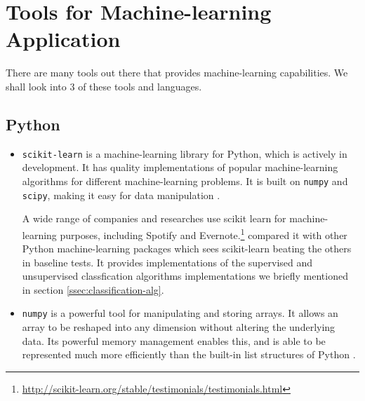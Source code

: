 


\newpage
\section{Tools for Machine-learning Application}
There are many tools out there that provides machine-learning capabilities. We shall look into 3 of these tools and languages. 

\subsection{Python}
\begin{itemize}
  \item \texttt{scikit-learn} is a machine-learning library for Python, which is actively in development. It has quality implementations of popular machine-learning algorithms for different machine-learning problems. It is built on \texttt{numpy} and \texttt{scipy}, making it easy for data manipulation \cite{scikit-learn-paper}. 
    
A wide range of companies and researches use scikit learn for machine-learning purposes, including Spotify and Evernote.\footnote{\url{http://scikit-learn.org/stable/testimonials/testimonials.html}}  compared it with other Python machine-learning packages which sees scikit-learn beating the others in baseline tests. It provides implementations of the supervised and unsupervised classfication algorithms implementations we briefly mentioned in section \ref{ssec:classification-alg}.

  \item \texttt{numpy} is a powerful tool for manipulating and storing arrays. It allows an array to be reshaped into any dimension without altering the underlying data. Its powerful memory management enables this, and is able to be represented much more efficiently than the built-in list structures of Python \cite{numpy}.
\end{itemize}

